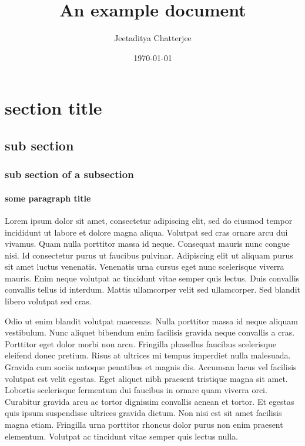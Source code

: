 \documentclass[15pt,a4paper]{article}
\title{An example document}
\author{Jeetaditya Chatterjee}
\date{\today}
\begin{document}
\maketitle
\tableofcontents
\newpage
\section{section title}

\subsection{sub section}

\subsubsection{sub section of a subsection}

\paragraph{some paragraph title}

Lorem ipsum dolor sit amet, consectetur adipiscing elit, sed do eiusmod tempor incididunt ut labore et dolore magna aliqua. Volutpat sed cras ornare arcu dui vivamus. Quam nulla porttitor massa id neque. Consequat mauris nunc congue nisi. Id consectetur purus ut faucibus pulvinar. Adipiscing elit ut aliquam purus sit amet luctus venenatis. Venenatis urna cursus eget nunc scelerisque viverra mauris. Enim neque volutpat ac tincidunt vitae semper quis lectus. Duis convallis convallis tellus id interdum. Mattis ullamcorper velit sed ullamcorper. Sed blandit libero volutpat sed cras.

Odio ut enim blandit volutpat maecenas. Nulla porttitor massa id neque aliquam vestibulum. Nunc aliquet bibendum enim facilisis gravida neque convallis a cras. Porttitor eget dolor morbi non arcu. Fringilla phasellus faucibus scelerisque eleifend donec pretium. Risus at ultrices mi tempus imperdiet nulla malesuada. Gravida cum sociis natoque penatibus et magnis dis. Accumsan lacus vel facilisis volutpat est velit egestas. Eget aliquet nibh praesent tristique magna sit amet. Lobortis scelerisque fermentum dui faucibus in ornare quam viverra orci. Curabitur gravida arcu ac tortor dignissim convallis aenean et tortor. Et egestas quis ipsum suspendisse ultrices gravida dictum. Non nisi est sit amet facilisis magna etiam. Fringilla urna porttitor rhoncus dolor purus non enim praesent elementum. Volutpat ac tincidunt vitae semper quis lectus nulla.
\end{document}
